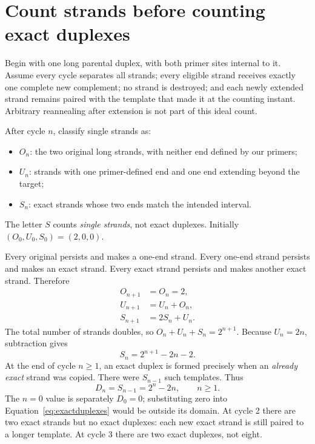 \section{Count strands before counting exact duplexes}
Begin with one long parental duplex, with both primer sites internal to it. Assume every cycle separates all strands; every eligible strand receives exactly one complete new complement; no strand is destroyed; and each newly extended strand remains paired with the template that made it at the counting instant. Arbitrary reannealing after extension is not part of this ideal count.

After cycle $n$, classify single strands as:
\begin{itemize}
\item $O_n$: the two original long strands, with neither end defined by our primers;
\item $U_n$: strands with one primer-defined end and one end extending beyond the target;
\item $S_n$: exact strands whose two ends match the intended interval.
\end{itemize}
The letter $S$ counts \emph{single strands}, not exact duplexes. Initially $(O_0,U_0,S_0)=(2,0,0)$.

Every original persists and makes a one-end strand. Every one-end strand persists and makes an exact strand. Every exact strand persists and makes another exact strand. Therefore
\begin{align}
O_{n+1}&=O_n=2,\\
U_{n+1}&=U_n+O_n,\\
S_{n+1}&=2S_n+U_n. \label{eq:lineage}
\end{align}
The total number of strands doubles, so $O_n+U_n+S_n=2^{n+1}$. Because $U_n=2n$, subtraction gives
\begin{equation}
S_n=2^{n+1}-2n-2. \label{eq:exactstrands}
\end{equation}
At the end of cycle $n\geq1$, an exact duplex is formed precisely when an \emph{already exact} strand was copied. There were $S_{n-1}$ such templates. Thus
\begin{equation}
D_n=S_{n-1}=2^n-2n,\qquad n\geq1. \label{eq:exactduplexes}
\end{equation}
The $n=0$ value is separately $D_0=0$; substituting zero into Equation~\ref{eq:exactduplexes} would be outside its domain. At cycle 2 there are two exact strands but no exact duplexes: each new exact strand is still paired to a longer template. At cycle 3 there are two exact duplexes, not eight.

